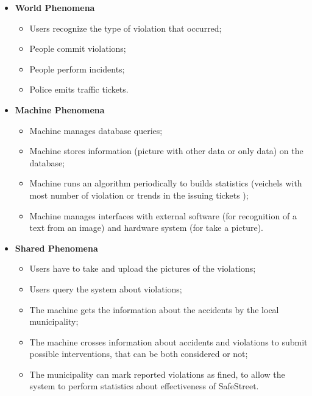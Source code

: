 \documentclass[../RASD.tex]{subfiles}
\begin{document}
    \begin{itemize}
        \item \textbf{World Phenomena}
        \begin{itemize}
            \item Users recognize the type of violation that occurred;
            \item People commit violations;
            \item People perform incidents;
            \item Police emits traffic tickets.
        \end{itemize}
        \item \textbf{Machine Phenomena}
        \begin{itemize}
            \item Machine manages database queries;
            \item Machine stores information (picture with other data or only data) on the database;
            \item Machine runs an algorithm periodically to builds statistics (veichels with most number of violation or trends in the issuing tickets );
            \item Machine manages interfaces with external software (for recognition of a text from an image) and hardware system (for take a picture).
        \end{itemize}
        \item \textbf{Shared Phenomena}
        \begin{itemize}
            \item Users have to take and upload the pictures of the violations;
            \item Users query the system about violations;
            \item The machine gets the information about the accidents by the local municipality;
            \item The machine crosses information about accidents and violations to submit possible interventions, that can be both considered or not;
            \item The municipality can mark reported violations as fined, to allow the system to perform statistics about effectiveness of SafeStreet.
        \end{itemize}
    \end{itemize}
\end{document}
